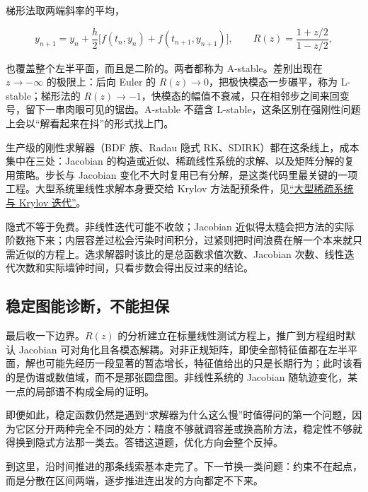 梯形法取两端斜率的平均，

\[
y_{n+1}=y_n+\frac h2\bigl[f(t_n,y_n)+f(t_{n+1},y_{n+1})\bigr],
\qquad R(z)=\frac{1+z/2}{1-z/2},
\]

也覆盖整个左半平面，而且是二阶的。两者都称为 A-stable。差别出现在 \(z\to-\infty\) 的极限上：后向 Euler 的 \(R(z)\to0\)，把极快模态一步碾平，称为 L-stable；梯形法的 \(R(z)\to-1\)，快模态的幅值不衰减，只在相邻步之间来回变号，留下一串肉眼可见的锯齿。A-stable 不蕴含 L-stable，这条区别在强刚性问题上会以``解看起来在抖''的形式找上门。

生产级的刚性求解器（BDF 族、Radau 隐式 RK、SDIRK）都在这条线上，成本集中在三处：Jacobian 的构造或近似、稀疏线性系统的求解、以及矩阵分解的复用策略。步长与 Jacobian 变化不大时复用已有分解，是这类代码里最关键的一项工程。大型系统里线性求解本身要交给 Krylov 方法配预条件，见\hyperref[sec:08-Numerical-Analysis/05-Numerical-Linear-Algebra/04]{``大型稀疏系统与 Krylov 迭代''}。

隐式不等于免费。非线性迭代可能不收敛；Jacobian 近似得太糙会把方法的实际阶数拖下来；内层容差过松会污染时间积分，过紧则把时间浪费在解一个本来就只需近似的方程上。选求解器时该比的是总函数求值次数、Jacobian 次数、线性迭代次数和实际墙钟时间，只看步数会得出反过来的结论。

\subsection{稳定图能诊断，不能担保}

最后收一下边界。\(R(z)\) 的分析建立在标量线性测试方程上，推广到方程组时默认 Jacobian 可对角化且各模态解耦。对非正规矩阵，即使全部特征值都在左半平面，解也可能先经历一段显著的暂态增长，特征值给出的只是长期行为；此时该看的是伪谱或数值域，而不是那张圆盘图。非线性系统的 Jacobian 随轨迹变化，某一点的局部谱不构成全局的证明。

即便如此，稳定函数仍然是遇到``求解器为什么这么慢''时值得问的第一个问题，因为它区分开两种完全不同的处方：精度不够就调容差或换高阶方法，稳定性不够就得换到隐式方法那一类去。答错这道题，优化方向会整个反掉。

到这里，沿时间推进的那条线索基本走完了。下一节换一类问题：约束不在起点，而是分散在区间两端，逐步推进连出发的方向都定不下来。
